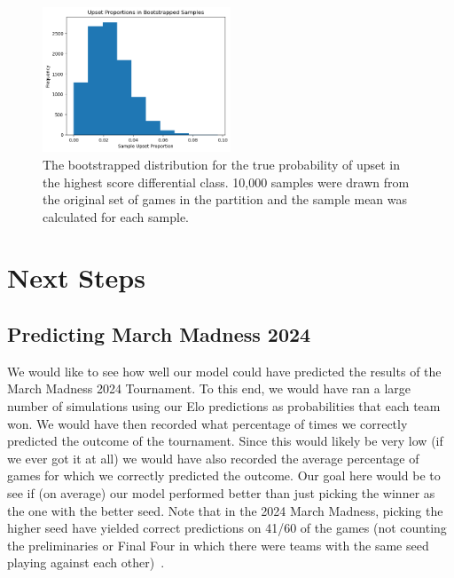 \documentclass{article}
\begin{document}
\begin{figure}[!htb]
    \begin{center}
      \includegraphics[width=0.5\textwidth]{Bootstrapped dist.png}
    \end{center}
    \caption{The bootstrapped distribution for the true probability of upset in the highest score differential class. 10,000 samples were drawn from the original set of games in the partition and the sample mean was calculated for each sample.}
    \label{fig:bootstrap dist}
  \end{figure}



\section{Next Steps}\label{nextSteps}
\subsection{Predicting March Madness 2024}
We would like to see how well our model could have predicted the results of the March Madness 2024 Tournament. To this end, we would have ran a large number of simulations using our Elo predictions as probabilities that each team won. We would have then recorded what percentage of times we correctly predicted the outcome of the tournament. Since this would likely be very low (if we ever got it at all) we would have also recorded the average percentage of games for which we correctly predicted the outcome. Our goal here would be to see if (on average) our model performed better than just picking the winner as the one with the better seed. Note that in the 2024 March Madness, picking the higher seed have yielded correct predictions on 41/60 of the games (not counting the preliminaries or Final Four in which there were teams with the same seed playing against each other)~\cite{wikipedia2024NCAA}.
\end{document}
